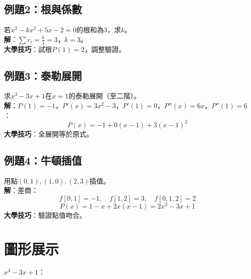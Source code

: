 \subsection{例題2：根與係數}
若$x^3 - kx^2 + 5x - 2 = 0$的根和為$3$，求$k$。\\
\textbf{解}：$\sum r_i = \frac{k}{1} = 3$，$k = 3$。\\
\textbf{大學技巧}：試根$P(1) = 2$，調整驗證。

\subsection{例題3：泰勒展開}
求$x^3 - 3x + 1$在$x = 1$的泰勒展開（至二階）。\\
\textbf{解}：$P(1) = -1$，$P'(x) = 3x^2 - 3$，$P'(1) = 0$，$P''(x) = 6x$，$P''(1) = 6$：
\[
P(x) = -1 + 0(x - 1) + 3(x - 1)^2
\]
\textbf{大學技巧}：全展開等於原式。

\subsection{例題4：牛頓插值}
用點$(0, 1), (1, 0), (2, 3)$插值。\\
\textbf{解}：差商：
\[
f[0, 1] = -1, \quad f[1, 2] = 3, \quad f[0, 1, 2] = 2
\]
\[
P(x) = 1 - x + 2x(x - 1) = 2x^2 - 3x + 1
\]
\textbf{大學技巧}：驗證點值吻合。

\section{圖形展示}
$x^3 - 3x + 1$：

